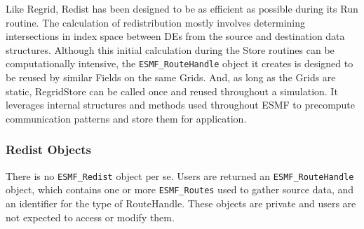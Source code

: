 


Like Regrid, Redist has been designed to be as efficient as possible during its
Run routine.  The calculation of redistribution mostly involves determining
intersections in index space between DEs from the source and destination data
structures.  Although this initial calculation during the Store routines
can be computationally intensive, the {\tt ESMF\_RouteHandle} object
it creates is designed to be reused by similar Fields on the same Grids.
And, as long as the Grids are static, RegridStore can be called once
and reused throughout a simulation.  It leverages internal structures
and methods used throughout ESMF to precompute communication patterns and
store them for application.

\subsubsection{Redist Objects}

There is no {\tt ESMF\_Redist} object per se.  Users are returned an
{\tt ESMF\_RouteHandle} object, which contains one or more {\tt ESMF\_Routes}
used to gather source data, and an identifier for the type of RouteHandle.  These
objects are private and users are not expected to access or modify them.
